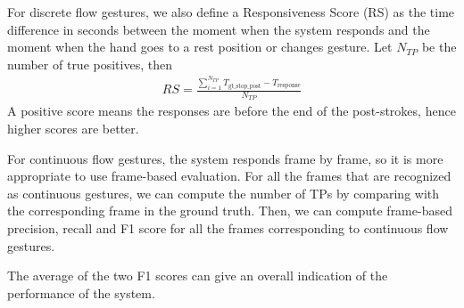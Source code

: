 For discrete flow gestures, we also define a Responsiveness Score (RS) as the
time difference in seconds between the moment when the system responds and the moment when the hand goes to a rest
position or changes gesture. Let $N_{TP}$ be the number of true positives, then
\begin{align}
RS = \frac{\sum_{i = 1}^{N_{TP}}T_{{\text{gt\_stop\_post}}} -
T_{\text{response}}}{N_{TP}}
\end{align}
A positive score means the responses are before the end of the post-strokes,
hence higher scores are better.

For continuous flow gestures, the system responds frame by frame,
so it is more appropriate to use frame-based evaluation. For all the frames that are
recognized as continuous gestures, we can compute the number of TPs by
comparing with the corresponding frame in the ground truth. Then, we can
compute frame-based precision, recall and F1 score for all the frames
corresponding to continuous flow gestures.

The average of the two F1 scores can give an overall indication of the
performance of the system.

